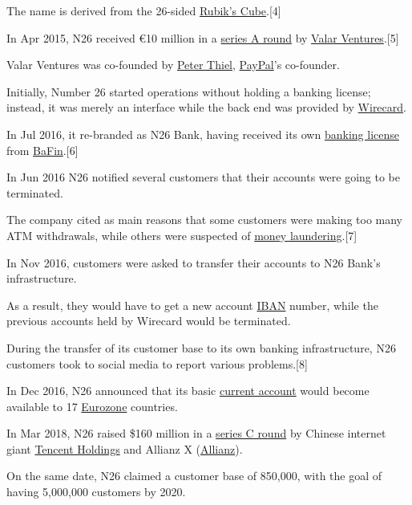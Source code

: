 \documentclass[onsided]{book}
\numberwithin{equation}{section}
\begin{document}
The name is derived from the 26-sided \href{https://en.wikipedia.org/wiki/Rubik%27s_Cube}{Rubik's Cube}.[4]
    
In Apr 2015, N26 received €10 million in a \href{https://en.wikipedia.org/wiki/Series_A_round}{series A round} by \href{https://en.wikipedia.org/wiki/Valar_Ventures}{Valar Ventures}.[5]

Valar Ventures was co-founded by \href{https://en.wikipedia.org/wiki/Peter_Thiel}{Peter Thiel}, \href{https://en.wikipedia.org/wiki/PayPal}{PayPal}'s co-founder.

%
Initially, Number 26 started operations without holding a banking license; instead, it was merely an interface while the back end was provided by \href{https://en.wikipedia.org/wiki/Wirecard}{Wirecard}.

In Jul 2016, it re-branded as N26 Bank, having received its own \href{https://en.wikipedia.org/wiki/Banking_license}{banking license} from \href{https://en.wikipedia.org/wiki/BaFin}{BaFin}.[6]

%
In Jun 2016 N26 notified several customers that their accounts were going to be terminated.

The company cited as main reasons that some customers were making too many ATM withdrawals, while others were suspected of \href{https://en.wikipedia.org/wiki/Money_laundering}{money laundering}.[7]

%
In Nov 2016, customers were asked to transfer their accounts to N26 Bank's infrastructure.

As a result, they would have to get a new account \href{https://en.wikipedia.org/wiki/IBAN}{IBAN} number, while the previous accounts held by Wirecard would be terminated.

During the transfer of its customer base to its own banking infrastructure, N26 customers took to social media to report various problems.[8]

%
In Dec 2016, N26 announced that its basic \href{https://en.wikipedia.org/wiki/Current_account_(banking)}{current account} would become available to 17 \href{https://en.wikipedia.org/wiki/Eurozone}{Eurozone} countries. 

%
In Mar 2018, N26 raised \$160 million in a \href{https://en.wikipedia.org/wiki/Series_C_round}{series C round} by Chinese internet giant \href{https://en.wikipedia.org/wiki/Tencent_Holdings}{Tencent Holdings} and Allianz X (\href{https://en.wikipedia.org/wiki/Allianz}{Allianz}).

On the same date, N26 claimed a customer base of 850,000, with the goal of having 5,000,000 customers by 2020.
\end{document}
